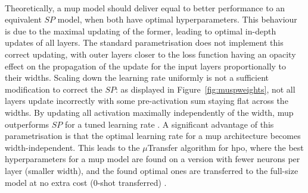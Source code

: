 \paragraph{}Theoretically, a \gls{mup} model should deliver equal to better performance to an equivalent $SP$ model, when both have optimal hyperparameters. This behaviour is due to the maximal updating of the former, leading to optimal in-depth updates of all layers. The standard parametrisation does not implement this correct updating, with outer layers closer to the loss function having an opacity effect on the propagation of the update for the input layers proportionally to their widths. Scaling down the learning rate uniformly is not a sufficient modification to correct the $SP$: as displayed in Figure~\ref{fig:muspweights}, not all layers update incorrectly with some pre-activation sum staying flat across the widths. By updating all activation maximally independently of the width, \gls{mup} outperforms $SP$ for a tuned learning rate \cite{pmlr-v139-yang21c}. A significant advantage of this parametrisation is that the optimal learning rate for a \gls{mup} architecture becomes width-independent. This leads to the $\mu$Transfer algorithm for \gls{hpo}, where the best hyperparameters for a \gls{mup} model are found on a version with fewer neurons per layer (smaller width), and the found optimal ones are transferred to the full-size model at no extra cost (0-shot transferred) \cite{yang2021tuning}. \\

